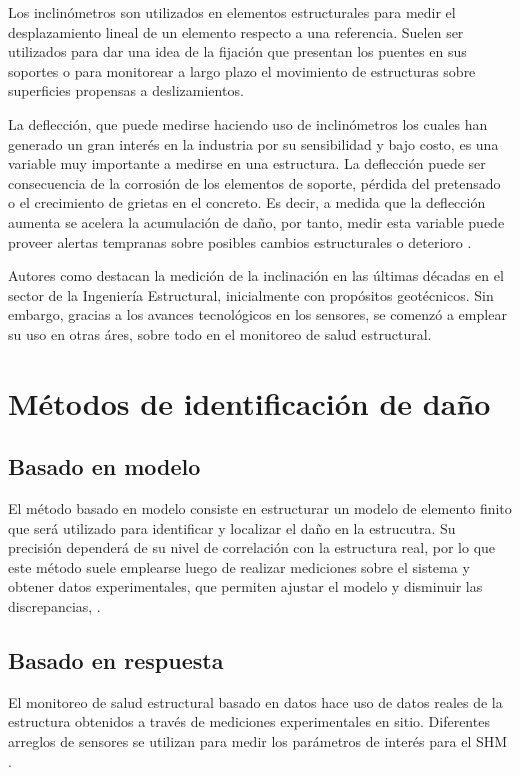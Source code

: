 \begin{itemize}
        Los inclinómetros son utilizados en elementos estructurales para medir el desplazamiento lineal de un elemento respecto a una referencia. Suelen ser utilizados para dar una idea de la fijación que presentan los puentes en sus soportes o para monitorear a largo plazo el movimiento de estructuras sobre superficies propensas a deslizamientos.

        La deflección, que puede medirse haciendo uso de inclinómetros los cuales han generado un gran interés en la industria por su sensibilidad y bajo costo, es una variable muy importante a medirse en una estructura. La deflección puede ser consecuencia de la corrosión de los elementos de soporte, pérdida del pretensado o el crecimiento de grietas en el concreto. Es decir, a medida que la deflección aumenta se acelera la acumulación de daño, por tanto, medir esta variable puede proveer alertas tempranas sobre posibles cambios estructurales o deterioro \citep{zhang2017bridge}.

        Autores como \citet{komarizadehasl2022development} destacan la medición de la inclinación en las últimas décadas en el sector de la Ingeniería Estructural, inicialmente con propósitos geotécnicos. Sin embargo, gracias a los avances tecnológicos en los sensores, se comenzó a emplear su uso en otras áres, sobre todo en el monitoreo de salud estructural.

    \end{itemize}

\section{Métodos de identificación de daño}

    \subsection{Basado en modelo} El método basado en modelo consiste en estructurar un modelo de elemento finito que será utilizado para identificar y localizar el daño en la estrucutra. Su precisión dependerá de su nivel de correlación con la estructura real, por lo que este método suele emplearse luego de realizar mediciones sobre el sistema y obtener datos experimentales, que permiten ajustar el modelo y disminuir las discrepancias, \citep{garcia2023review}.

    \subsection{Basado en respuesta} El monitoreo de salud estructural basado en datos hace uso de datos reales de la estructura obtenidos a través de mediciones experimentales en sitio. Diferentes arreglos de sensores se utilizan para medir los parámetros de interés para el SHM \citep{mohamed2014}.

